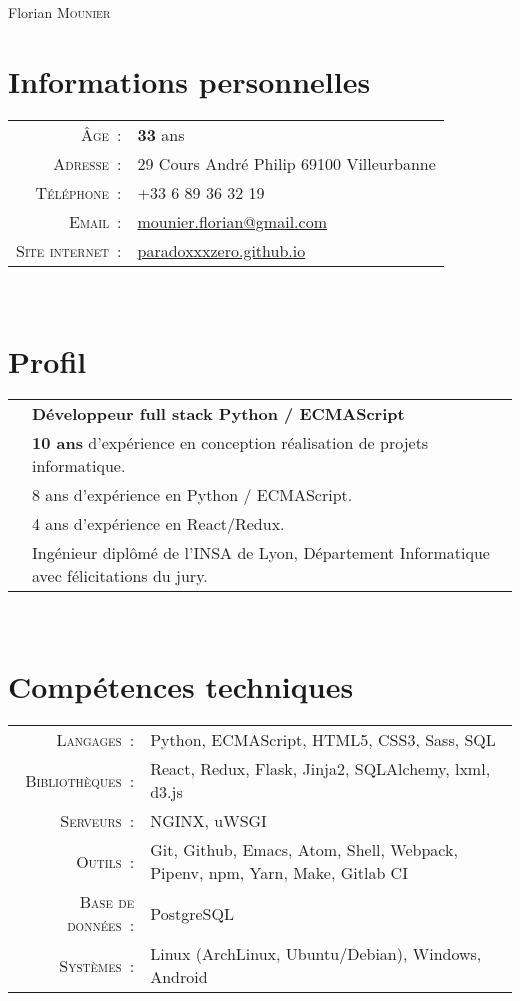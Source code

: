 \documentclass[a4paper,10pt]{article}
\begin{document}
\pagestyle{empty}
\par{\centering
  {\Huge Florian \textsc{Mounier}
  }\bigskip\par}

\section{Informations personnelles}
\begin{tabular}{rl}
  \textsc{Âge :}           & \textbf{33} ans \\
  \textsc{Adresse :}       & 29 Cours André Philip 69100 Villeurbanne \\
  \textsc{Téléphone :}     & +33 6 89 36 32 19 \\
  \textsc{Email :}         & \href{mailto:mounier.florian@gmail.com}{mounier.florian@gmail.com} \\
  \textsc{Site internet :} & \href{http://paradoxxxzero.github.com}{paradoxxxzero.github.io} \\
\end{tabular} \\

\section{Profil}
\begin{tabular}{rl}
  & \textbf {Développeur full stack Python / ECMAScript} \\
  & \textbf{10 ans} d’expérience en conception réalisation de projets informatique. \\
  & 8 ans d’expérience en Python / ECMAScript. \\
  & 4 ans d’expérience en React/Redux. \\
  & Ingénieur diplômé de l’INSA de Lyon, Département Informatique avec félicitations du jury. \\
\end{tabular} \\

\section{Compétences techniques}
\begin{tabular}{rl}
  \textsc{Langages :}        & Python, ECMAScript, HTML5, CSS3, Sass, SQL \\
  \textsc{Bibliothèques :}   & React, Redux, Flask, Jinja2, SQLAlchemy, lxml, d3.js \\
  \textsc{Serveurs :}        & NGINX, uWSGI \\
  \textsc{Outils :}          & Git, Github, Emacs, Atom, Shell, Webpack, Pipenv, npm, Yarn, Make, Gitlab CI \\
  \textsc{Base de données :} & PostgreSQL \\
  \textsc{Systèmes :}        & Linux (ArchLinux, Ubuntu/Debian), Windows, Android \\
\end{tabular} \\
\end{document}
